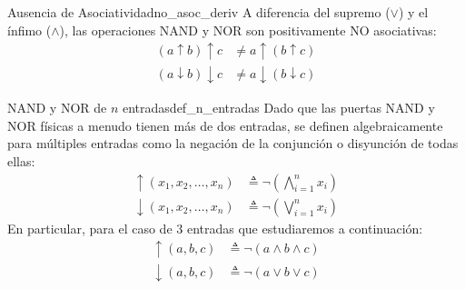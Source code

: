 \begin{teorema}{Ausencia de Asociatividad}{no_asoc_deriv}
A diferencia del supremo ($\vee$) y el ínfimo ($\wedge$), las operaciones NAND y NOR son positivamente NO asociativas:
\begin{align*}
    (a \uparrow b) \uparrow c &\neq a \uparrow (b \uparrow c) \\
    (a \downarrow b) \downarrow c &\neq a \downarrow (b \downarrow c)
\end{align*}
\end{teorema}

\begin{definicion}{NAND y NOR de $n$ entradas}{def_n_entradas}
Dado que las puertas NAND y NOR físicas a menudo tienen más de dos entradas, se definen algebraicamente para múltiples entradas como la negación de la conjunción o disyunción de todas ellas:
\begin{align*}
    \uparrow(x_1, x_2, \dots, x_n) &\triangleq \neg \left( \bigwedge_{i=1}^n x_i \right) \\
    \downarrow(x_1, x_2, \dots, x_n) &\triangleq \neg \left( \bigvee_{i=1}^n x_i \right)
\end{align*}
En particular, para el caso de 3 entradas que estudiaremos a continuación:
\begin{align*}
    \uparrow(a,b,c) &\triangleq \neg(a \wedge b \wedge c) \\
    \downarrow(a,b,c) &\triangleq \neg(a \vee b \vee c)
\end{align*}
\end{definicion}

